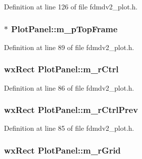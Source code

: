 Definition at line 126 of file fdmdv2\-\_\-plot.\-h.

\hypertarget{class_plot_panel_ad28637582a93843082fc7b1d8d80c807}{
\subsubsection[{m\-\_\-p\-Top\-Frame}]{$\ast$ Plot\-Panel\-::m\-\_\-p\-Top\-Frame}}\label{class_plot_panel_ad28637582a93843082fc7b1d8d80c807}


Definition at line 89 of file fdmdv2\-\_\-plot.\-h.

\hypertarget{class_plot_panel_a2c10cfe6bcd979613cec037a71ba2c94}{
\subsubsection[{m\-\_\-r\-Ctrl}]{\setlength{\rightskip}{0pt plus 5cm}wx\-Rect Plot\-Panel\-::m\-\_\-r\-Ctrl}}\label{class_plot_panel_a2c10cfe6bcd979613cec037a71ba2c94}


Definition at line 86 of file fdmdv2\-\_\-plot.\-h.

\hypertarget{class_plot_panel_aef7e50cc8a27b9434d17d7d8c245606c}{
\subsubsection[{m\-\_\-r\-Ctrl\-Prev}]{\setlength{\rightskip}{0pt plus 5cm}wx\-Rect Plot\-Panel\-::m\-\_\-r\-Ctrl\-Prev}}\label{class_plot_panel_aef7e50cc8a27b9434d17d7d8c245606c}


Definition at line 85 of file fdmdv2\-\_\-plot.\-h.

\hypertarget{class_plot_panel_ae8d79eab28220ea1fa8ffcbfd70bc84a}{
\subsubsection[{m\-\_\-r\-Grid}]{\setlength{\rightskip}{0pt plus 5cm}wx\-Rect Plot\-Panel\-::m\-\_\-r\-Grid}}\label{class_plot_panel_ae8d79eab28220ea1fa8ffcbfd70bc84a}


